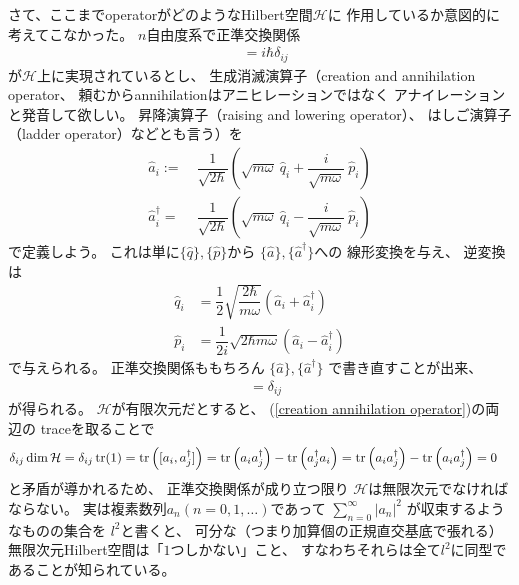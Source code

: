 さて、ここまでoperatorがどのようなHilbert空間$\mathcal{H}$に
作用しているか意図的に考えてこなかった。
$n$自由度系で正準交換関係
\begin{align}
    [ \hat{q}_i , \hat{p}_j ] &= i\hbar \delta_{ij}
\end{align}
が$\mathcal{H}$上に実現されているとし、
生成消滅演算子（creation and annihilation operator、
頼むからannihilationはアニヒレーションではなく
アナイレーションと発音して欲しい。
昇降演算子（raising and lowering operator）、
はしご演算子（ladder operator）などとも言う）を
\begin{subequations}
\begin{align}
    \hat{a}_i :=\ &
    \dfrac{1}{\sqrt{2\hbar}}
    \left(
        \sqrt{
            m\omega
        }\ \hat{q}_i
        +
        \dfrac{i}{\sqrt{m\omega}}
        \ \hat{p}_i
    \right)
\label{annihilation operator definition}
\\
    \hat{a}^\dagger_i =\ &
    \dfrac{1}{\sqrt{2\hbar}}
    \left(
        \sqrt{
            m\omega
        }\ \hat{q}_i
        -
        \dfrac{i}{\sqrt{m\omega}}
        \ \hat{p}_i
    \right)
\end{align}
\end{subequations}
で定義しよう。
これは単に$\{\hat{q}\}, \{\hat{p}\}$から
$\{\hat{a}\}, \{\hat{a}^\dagger\}$への
線形変換を与え、
逆変換は
\begin{subequations}
\begin{align}
    \hat{q}_i &=
    \dfrac{1}{2}\sqrt{
        \dfrac{2\hbar}{m\omega}
    }
    \left(
        \hat{a}_i + \hat{a}^\dagger_i
    \right)
\\
    \hat{p}_i &=
    \dfrac{1}{2i}\sqrt{
        2\hbar m\omega
    }
    \left(
        \hat{a}_i - \hat{a}^\dagger_i
    \right)
\end{align}
\end{subequations}
で与えられる。
正準交換関係ももちろん
$\{\hat{a}\}, \{\hat{a}^\dagger\}$
で書き直すことが出来、
\begin{align}
    [\hat{a}_i, \hat{a}^\dagger_j]
    &=\delta_{ij}
\label{creation annihilation operator}
\end{align}
が得られる。
$ \mathcal{H} $が有限次元だとすると、
(\ref{creation annihilation operator})の両辺の
traceを取ることで
\begin{align}
    \delta_{ij}
    \dim \mathcal{H}
    &=
    \delta_{ij}
    \tr (1)
    =
    \tr \left(
        [a_i, a^\dagger_j]
    \right)
    =
    \tr \left(
        a_i a^\dagger_j
    \right)
    -
    \tr \left(
        a^\dagger_j a_i
    \right)
    =
    \tr \left(
        a_i a^\dagger_j
    \right)
    -
    \tr \left(
        a_i a^\dagger_j
    \right)
    = 0
\end{align}
と矛盾が導かれるため、
正準交換関係が成り立つ限り
$\mathcal{H}$は無限次元でなければならない。
実は複素数列$a_n (n=0,1,\dots)$であって
$\sum_{n=0}^\infty |a_n|^2$
が収束するようなものの集合を
$l^2$と書くと、
可分な（つまり加算個の正規直交基底で張れる）
無限次元Hilbert空間は「$1$つしかない」こと、
すなわちそれらは全て$l^2$に同型であることが知られている。

